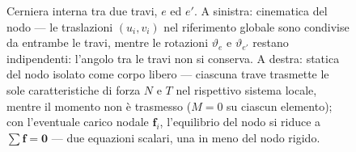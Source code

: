 \begin{figure}[htbp]
{
	}%
	\caption{Cerniera interna tra due travi, $e$ ed $e'$. A sinistra:
		cinematica del nodo --- le traslazioni $(u_i, v_i)$ nel
		riferimento globale sono condivise da entrambe le travi,
		mentre le rotazioni $\vartheta_e$ e $\vartheta_{e'}$ restano
		indipendenti: l'angolo tra le travi non si conserva.
		A destra: statica del nodo isolato come corpo libero ---
		ciascuna trave trasmette le sole caratteristiche di forza
		$N$ e $T$ nel rispettivo sistema locale, mentre il momento
		non è trasmesso ($M = 0$ su ciascun elemento); con
		l'eventuale carico nodale $\mathbf{f}_i$, l'equilibrio del
		nodo si riduce a $\sum\mathbf{f}=\mathbf{0}$ --- due
		equazioni scalari, una in meno del nodo rigido.}
	\label{fig:cerniera_interna}
\end{figure}




